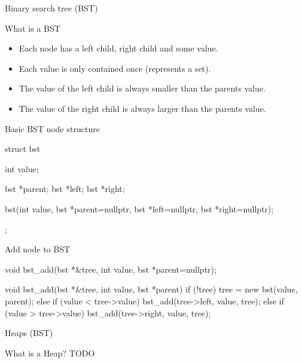 \documentclass{beamer}
\begin{document}
\begin{frame}
    \begin{center}
        \begin{LARGE}
            Binary search tree (BST)
        \end{LARGE}
    \end{center}
\end{frame}


\begin{frame}{What is a BST}
    \begin{itemize}
        \item Each node has a left child, right child and some value.
        \item Each value is only contained once (represents a set).
        \item The value of the left child is always smaller than the parents value.
        \item The value of the right child is always larger than the parents value. 
    \end{itemize}
\end{frame}


\begin{frame}[fragile]{Basic BST node structure}
\begin{cppcode}
struct bst {
    int value;

    bst *parent;
    bst *left;
    bst *right;

    bst(int value, bst *parent=nullptr, bst *left=nullptr, 
        bst *right=nullptr);
};
\end{cppcode}
\end{frame}


\begin{frame}[fragile]{Add node to BST}
\begin{cppcode}
void bst_add(bst *&tree, int value, bst *parent=nullptr);


void bst_add(bst *&tree, int value, bst *parent) {
    if (!tree)
        tree = new bst(value, parent);
    else if (value < tree->value)
        bst_add(tree->left, value, tree);
    else if (value > tree->value)
        bst_add(tree->right, value, tree);
}
\end{cppcode}
\end{frame}


\begin{frame}
    \begin{center}
        \begin{LARGE}
            Heaps (BST)
        \end{LARGE}
    \end{center}
\end{frame}

\begin{frame}[fragile]{What is a Heap?}
TODO
\end{frame}
\end{document}
